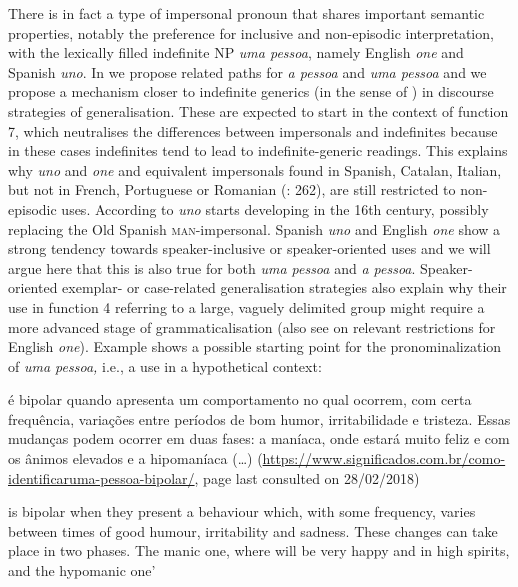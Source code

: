 \documentclass[output=paper]{langscibook}
\begin{document}
{There is in fact a type of impersonal pronoun that shares important semantic properties, notably the preference for inclusive and non-episodic interpretation, with the lexically filled indefinite NP} {\textit{uma pessoa}}{, namely English} {\textit{one}} {and Spanish} {\textit{uno}}{. In \citet{AmaralMihatsch2019} we propose related paths for} {\textit{a pessoa}} {and} {\textit{uma pessoa}} {and we propose a mechanism closer to indefinite generics} {(in the sense of \citealt{KrifkaGerstner-Link1993}) in discourse strategies of generalisation. These are expected to start in the context of function 7, which neutralises the differences between impersonals and indefinites because in these cases indefinites tend to lead to indefinite-generic readings. This explains why} {\textit{uno}} {and} {\textit{one}} {and equivalent impersonals found in Spanish, Catalan, Italian, but not in French, Portuguese or Romanian (\citealt{CabredoHofherr2017}: 262), are still restricted to non-episodic uses. According to \citet[1197--1207]{CompanyPozas2009}} {\textit{uno}} {starts developing in the 16th century, possibly replacing the Old Spanish} {\textsc{man}}{{}-impersonal. Spanish} {\textit{uno}} {and English} {\textit{one} }{show a strong tendency towards speaker-inclusive or speaker-oriented uses \citep{Moltmann2010} and we will argue here that this is also true for both}{ \textit{uma pessoa}} {and} {\textit{a pessoa}}{. Speaker-oriented exemplar- or case-related generalisation strategies also explain why their use in function 4 referring to a large, vaguely delimited group might require a more advanced stage of grammaticalisation (also see \citealt{Moltmann2010} on relevant restrictions for English} {\textit{one}}{). Example  shows a possible starting point for the pronominalization of} {\textit{uma pessoa,} }{i.e., a use in a hypothetical context:}

\eanoraggedright\label{ex:amaral:14}\begin{otherlanguage}{portuguese}
 é bipolar quando apresenta um comportamento no qual ocorrem, com certa frequência, variações entre períodos de bom humor, irritabilidade e tristeza. Essas mudanças podem ocorrer em duas fases: a maníaca, onde  estará muito feliz e com os ânimos elevados e a hipomaníaca (…) (\url{https://www.significados.com.br/como-identificaruma-pessoa-bipolar/}, page last consulted on 28/02/2018)
\end{otherlanguage}
 {is bipolar when they present a behaviour which, with some frequency, varies between times of good humour, irritability and sadness. These changes can take place in two phases. The manic one, where} { } {will be very happy and in high spirits, and the hypomanic one’}
\z 
\end{document}
